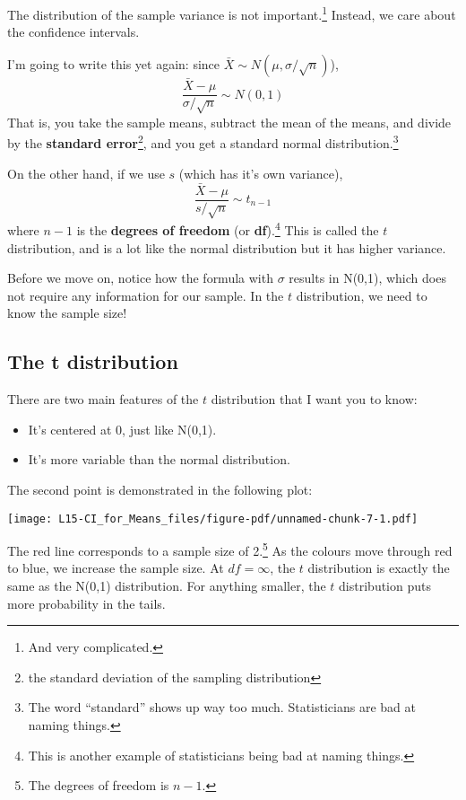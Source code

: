 \documentclass[
  letterpaper,
  DIV=11,
  numbers=noendperiod]{scrreprt}
\providecommand{\tightlist}{%
  \setlength{\itemsep}{0pt}\setlength{\parskip}{0pt}}\usepackage{longtable,booktabs,array}
\begin{document}
The distribution of the sample variance is not important.\footnote{And
  very complicated.} Instead, we care about the confidence intervals.

I'm going to write this yet again: since
\(\bar X\sim N(\mu,\sigma/\sqrt{n})\)), \[
\frac{\bar X - \mu}{\sigma/\sqrt{n}} \sim N(0, 1)
\] That is, you take the sample means, subtract the mean of the means,
and divide by the \textbf{standard error}\footnote{the standard
  deviation of the sampling distribution}, and you get a standard normal
distribution.\footnote{The word ``standard'' shows up way too much.
  Statisticians are bad at naming things.}

On the other hand, if we use \(s\) (which has it's own variance), \[
\frac{\bar X - \mu}{s/\sqrt{n}} \sim t_{n-1}
\] where \(n-1\) is the \textbf{degrees of freedom} (or
\textbf{df}).\footnote{This is another example of statisticians being
  bad at naming things.} This is called the \(t\) distribution, and is a
lot like the normal distribution but it has higher variance.

Before we move on, notice how the formula with \(\sigma\) results in
N(0,1), which does not require any information for our sample. In the
\(t\) distribution, we need to know the sample size!

\hypertarget{the-t-distribution}{%
\subsection{The t distribution}\label{the-t-distribution}}

There are two main features of the \(t\) distribution that I want you to
know:

\begin{itemize}
\tightlist
\item
  It's centered at 0, just like N(0,1).
\item
  It's more variable than the normal distribution.
\end{itemize}

The second point is demonstrated in the following plot:

\texttt{[image: L15-CI\_for\_Means\_files/figure-pdf/unnamed-chunk-7-1.pdf]}

The red line corresponds to a sample size of 2.\footnote{The degrees of
  freedom is \(n-1\).} As the colours move through red to blue, we
increase the sample size. At \(df = \infty\), the \(t\) distribution is
exactly the same as the N(0,1) distribution. For anything smaller, the
\(t\) distribution puts more probability in the tails.
\end{document}

